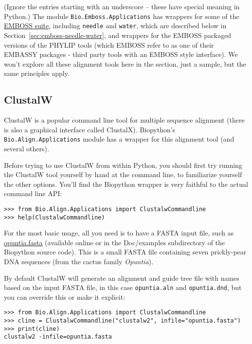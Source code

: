 \noindent (Ignore the entries starting with an underscore -- these have
special meaning in Python.)
The module \verb|Bio.Emboss.Applications| has wrappers for some of the
\href{http://emboss.sourceforge.net/}{EMBOSS suite}, including
\texttt{needle} and \texttt{water}, which are described below in
Section~\ref{sec:emboss-needle-water}, and wrappers for the EMBOSS
packaged versions of the PHYLIP tools (which EMBOSS refer to as one
of their EMBASSY packages - third party tools with an EMBOSS style
interface).
We won't explore all these alignment tools here in the section, just a
sample, but the same principles apply.

\subsection{ClustalW}
\label{sec:align_clustal}
ClustalW is a popular command line tool for multiple sequence alignment
(there is also a graphical interface called ClustalX). Biopython's
\verb|Bio.Align.Applications| module has a wrapper for this alignment tool
(and several others).

Before trying to use ClustalW from within Python, you should first try running
the ClustalW tool yourself by hand at the command line, to familiarize
yourself the other options. You'll find the Biopython wrapper is very
faithful to the actual command line API:

\begin{verbatim}
>>> from Bio.Align.Applications import ClustalwCommandline
>>> help(ClustalwCommandline)
\end{verbatim}

For the most basic usage, all you need is to have a FASTA input file, such as
\href{https://raw.githubusercontent.com/biopython/biopython/master/Doc/examples/opuntia.fasta}{opuntia.fasta}
(available online or in the Doc/examples subdirectory of the Biopython source
code). This is a small FASTA file containing seven prickly-pear DNA sequences
(from the cactus family \textit{Opuntia}).

By default ClustalW will generate an alignment and guide tree file with names
based on the input FASTA file, in this case \texttt{opuntia.aln} and
\texttt{opuntia.dnd}, but you can override this or make it explicit:

\begin{verbatim}
>>> from Bio.Align.Applications import ClustalwCommandline
>>> cline = ClustalwCommandline("clustalw2", infile="opuntia.fasta")
>>> print(cline)
clustalw2 -infile=opuntia.fasta
\end{verbatim}

